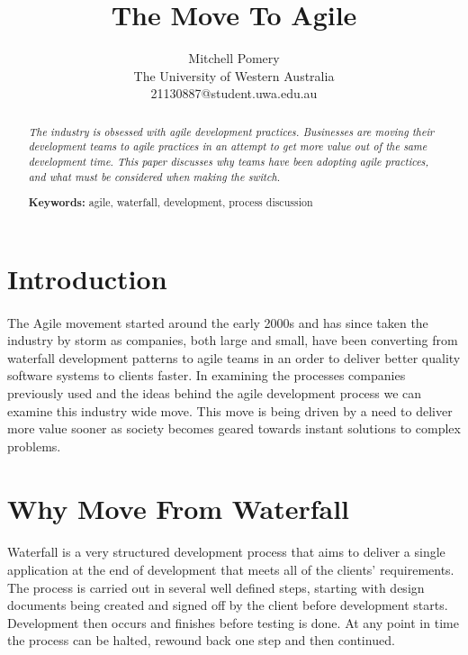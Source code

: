 \documentclass[11pt,twocolumn]{article}
\title{The Move To Agile}
\author{Mitchell Pomery\\
The University of Western Australia\\
21130887@student.uwa.edu.au}
\begin{document}
\maketitle

\begin{abstract}
\paragraph{}
\textit{The industry is obsessed with agile development practices.
Businesses are moving their development teams to agile practices in an attempt to get more value out of the same development time.
This paper discusses why teams have been adopting agile practices, and what must be considered when making the switch.}

\par
\textbf{Keywords:} agile, waterfall, development, process
discussion

\end{abstract}

\section{Introduction}
\paragraph{}
The Agile movement started around the early 2000s and has since taken the industry by storm as  companies, both large and small, have been converting from waterfall development patterns to agile teams in an order to deliver better quality software systems to clients faster.
In examining the processes companies previously used and the ideas behind the agile development process we can examine this industry wide move.
This move is being driven by a need to deliver more value sooner as society becomes geared towards instant solutions to complex problems.

\section{Why Move From Waterfall}
\paragraph{}
Waterfall is a very structured development process that aims to deliver a single application at the end of development that meets all of the clients' requirements.
The process is carried out in several well defined steps, starting with design documents being created and signed off by the client before development starts.
Development then occurs and finishes before testing is done.
At any point in time the process can be halted, rewound back one step and then continued.
\end{document}
